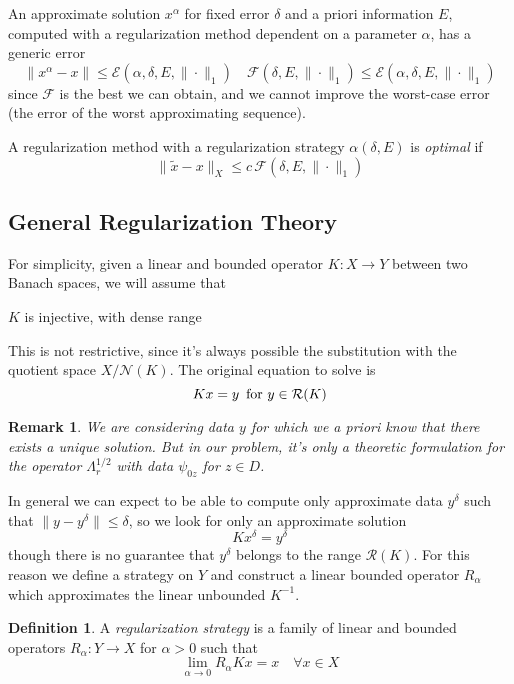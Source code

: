 \documentclass[10pt, a4paper, twoside, openright]{book}
\theoremstyle{definition}
\newtheorem{definition}[subsection]{Definition}
\theoremstyle{plain}
\theoremstyle{plain}
\theoremstyle{plain}
\theoremstyle{plain}
\newtheorem{remark}[subsection]{Remark}
\theoremstyle{plain}
\theoremstyle{plain}
\theoremstyle{plain}
\theoremstyle{plain}
\begin{document}
An approximate solution $x^\alpha$ for fixed error $\delta$ and a priori information $E$, computed with a regularization method dependent on a parameter $\alpha$, has a generic error
\begin{equation}
 \|x^\alpha -x\| \leq \mathcal{E}(\alpha, \delta, E, \|\cdot\|_1) \quad \mathcal{F}(\delta, E, \|\cdot\|_1)\leq\mathcal{E}(\alpha, \delta, E, \|\cdot\|_1)
\end{equation}
since $\mathcal{F}$ is the best we can obtain, and we cannot improve the worst-case error (the error of the worst approximating sequence).
\par
A regularization method with a regularization strategy $\alpha(\delta, E)$ is \emph{optimal} if 
\begin{equation}
 \|\tilde{x} - x\|_X \leq c\,\mathcal{F}(\delta, E, \|\cdot\|_1)
\end{equation}

\subsection{General Regularization Theory}
For simplicity, given a linear and bounded operator $K:X\to Y$ between two Banach spaces, we will assume that
\begin{center}
 $K$ is injective, with dense range
\end{center}
This is not restrictive, since it's always possible the substitution with the quotient space $X/ \mathcal{N}(K)$. The original equation to solve is
\begin{equation}
 Kx=y\,\textup{ for }y\in \mathcal{R}(K)
\end{equation}
\begin{remark}
 We are considering data $y$ for which we a priori know that there exists a unique solution. But in our problem, it's only a theoretic formulation for the operator $\Lambda_r^{1/2}$ with data $\psi_{0z}$ for $z\in D$.
\end{remark}
In general we can expect to be able to compute only approximate data $y^\delta$ such that $\|y - y^\delta\| \leq \delta$, so we look for only an approximate solution
\begin{equation}
 Kx^\delta = y^\delta
\end{equation}
though there is no guarantee that $y^\delta$ belongs to the range $\mathcal{R}(K)$. For this reason we define a strategy on $Y$ and construct a linear bounded operator $R_\alpha$ which approximates the linear unbounded $K^{-1}$.
\begin{definition}
 A \emph{regularization strategy} is a family of linear and bounded operators $R_\alpha : Y \to X$  for $\alpha> 0$ such that
 \begin{equation}
  \lim_{\alpha\to 0}R_\alpha Kx = x\quad \forall x \in X
 \end{equation}
\end{definition}
\end{document}
